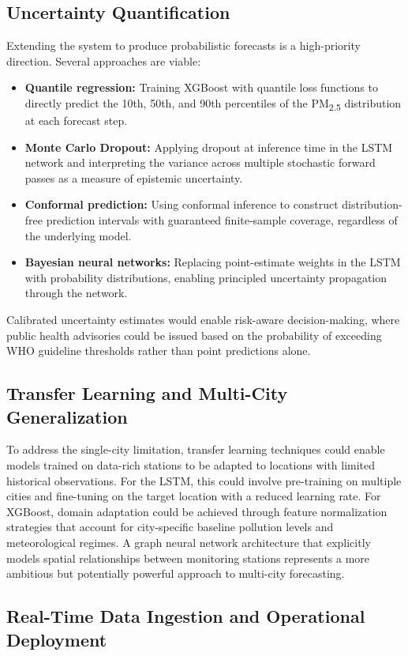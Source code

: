 \subsection{Uncertainty Quantification}

Extending the system to produce probabilistic forecasts is a high-priority direction. Several approaches are viable:

\begin{itemize}
    \item \textbf{Quantile regression:} Training XGBoost with quantile loss functions to directly predict the 10th, 50th, and 90th percentiles of the PM\textsubscript{2.5} distribution at each forecast step.
    \item \textbf{Monte Carlo Dropout:} Applying dropout at inference time in the LSTM network and interpreting the variance across multiple stochastic forward passes as a measure of epistemic uncertainty.
    \item \textbf{Conformal prediction:} Using conformal inference to construct distribution-free prediction intervals with guaranteed finite-sample coverage, regardless of the underlying model.
    \item \textbf{Bayesian neural networks:} Replacing point-estimate weights in the LSTM with probability distributions, enabling principled uncertainty propagation through the network.
\end{itemize}

Calibrated uncertainty estimates would enable risk-aware decision-making, where public health advisories could be issued based on the probability of exceeding WHO guideline thresholds rather than point predictions alone.

\subsection{Transfer Learning and Multi-City Generalization}

To address the single-city limitation, transfer learning techniques could enable models trained on data-rich stations to be adapted to locations with limited historical observations. For the LSTM, this could involve pre-training on multiple cities and fine-tuning on the target location with a reduced learning rate. For XGBoost, domain adaptation could be achieved through feature normalization strategies that account for city-specific baseline pollution levels and meteorological regimes. A graph neural network architecture that explicitly models spatial relationships between monitoring stations represents a more ambitious but potentially powerful approach to multi-city forecasting.

\subsection{Real-Time Data Ingestion and Operational Deployment}


